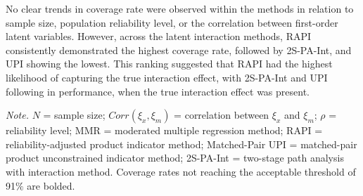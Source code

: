 \documentclass[
  man]{apa6}
\newenvironment{lltable}{\begin{landscape}\centering\begin{ThreePartTable}}{\end{ThreePartTable}\end{landscape}}
\begin{document}
No clear trends in coverage rate were observed within the methods in relation to sample size, population reliability level, or the correlation between first-order latent variables. However, across the latent interaction methods, RAPI consistently demonstrated the highest coverage rate, followed by 2S-PA-Int, and UPI showing the lowest. This ranking suggested that RAPI had the highest likelihood of capturing the true interaction effect, with 2S-PA-Int and UPI following in performance, when the true interaction effect was present.

\begin{lltable}

\begin{TableNotes}[para]
\normalsize{\textit{Note.} $\textit{N}$ = sample size; $Corr(\xi_{x}, \xi_{m})$ = correlation between $\xi_{x}$ and $\xi_{m}$; $\rho$ = reliability level; MMR = moderated multiple regression method; RAPI = reliability-adjusted product indicator method; Matched-Pair UPI = matched-pair product unconstrained indicator method; 2S-PA-Int = two-stage path analysis with interaction method. Coverage rates not reaching the acceptable threshold of 91$\%$ are bolded.}
\end{TableNotes}

\small{

}
\end{lltable}
\end{document}
